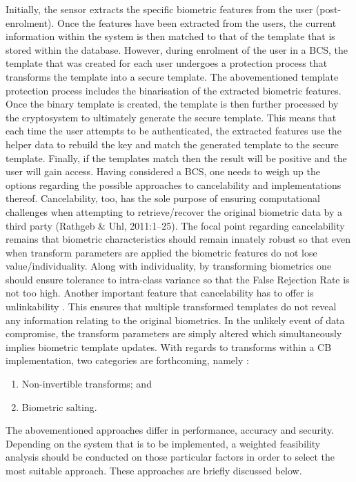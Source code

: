 Initially, the sensor extracts the specific biometric features from the user (post-enrolment). Once the features have been extracted from the users, the current information within the system is then matched to that of the template that is stored within the database. However, during enrolment of the user in a BCS, the template that was created for each user undergoes a protection process that transforms the template into a secure template. The abovementioned template protection process includes the binarisation of the extracted biometric features. Once the binary template is created, the template is then further processed by the cryptosystem to ultimately generate the secure template. This means that each time the user attempts to be authenticated, the extracted features use the helper data to rebuild the key and match the generated template to the secure template. Finally, if the templates match then the result will be positive and the user will gain access. 
Having considered a BCS, one needs to weigh up the options regarding the possible approaches to cancelability and implementations thereof. Cancelability, too, has the sole purpose of ensuring computational challenges when attempting to retrieve/recover the original biometric data by a third party (Rathgeb \& Uhl, 2011:1–25). The focal point regarding cancelability remains that biometric characteristics should remain innately robust so that even when transform parameters are applied the biometric features do not lose value/individuality. Along with individuality, by transforming biometrics one should ensure tolerance to intra-class variance so that the False Rejection Rate is not too high. Another important feature that cancelability has to offer is unlinkability \cite{Rathgeb2011}. This ensures that multiple transformed templates do not reveal any information relating to the original biometrics. In the unlikely event of data compromise, the transform parameters are simply altered which simultaneously implies biometric template updates. 
With regards to transforms within a CB implementation, two categories are forthcoming, namely \cite{Jain2016}:
  

\begin{enumerate}[label=\roman*.]
	\item Non-invertible transforms; and
	\item Biometric salting.
\end{enumerate}

The abovementioned approaches differ in performance, accuracy and security. Depending on the system that is to be implemented, a weighted feasibility analysis should be conducted on those particular factors in order to select the most suitable approach. These approaches are briefly discussed below.

